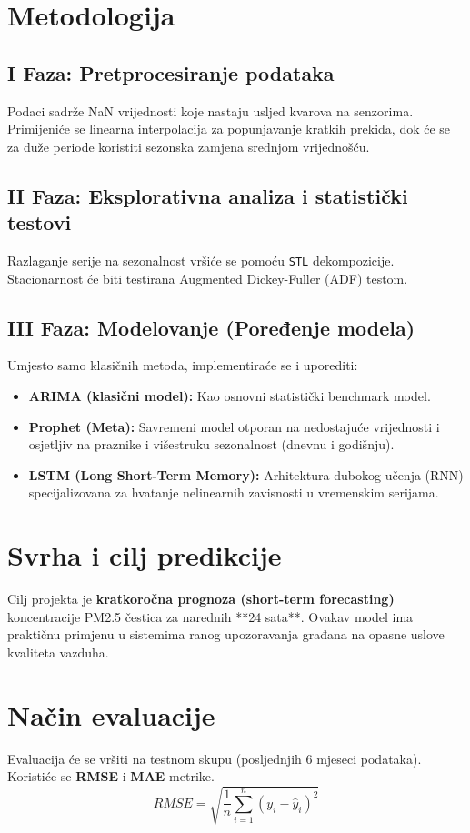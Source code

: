 \documentclass[12pt]{article}
\begin{document}
	\section{Metodologija}
	
	\subsection*{I Faza: Pretprocesiranje podataka}
	Podaci sadrže NaN vrijednosti koje nastaju usljed kvarova na senzorima. Primijeniće se linearna interpolacija za popunjavanje kratkih prekida, dok će se za duže periode koristiti sezonska zamjena srednjom vrijednošću.
	
	\subsection*{II Faza: Eksplorativna analiza i statistički testovi}
	Razlaganje serije na sezonalnost vršiće se pomoću \texttt{STL} dekompozicije. Stacionarnost će biti testirana Augmented Dickey-Fuller (ADF) testom.
	
	\subsection*{III Faza: Modelovanje (Poređenje modela)}
	Umjesto samo klasičnih metoda, implementiraće se i uporediti:
	\begin{itemize}
		\item \textbf{ARIMA (klasični model):} Kao osnovni statistički benchmark model.
		\item \textbf{Prophet (Meta):} Savremeni model otporan na nedostajuće vrijednosti i osjetljiv na praznike i višestruku sezonalnost (dnevnu i godišnju).
		\item \textbf{LSTM (Long Short-Term Memory):} Arhitektura dubokog učenja (RNN) specijalizovana za hvatanje nelinearnih zavisnosti u vremenskim serijama.
	\end{itemize}
	
	\section{Svrha i cilj predikcije}
	Cilj projekta je \textbf{kratkoročna prognoza (short-term forecasting)} koncentracije PM2.5 čestica za narednih **24 sata**. Ovakav model ima praktičnu primjenu u sistemima ranog upozoravanja građana na opasne uslove kvaliteta vazduha.
	
	\section{Način evaluacije}
	Evaluacija će se vršiti na testnom skupu (posljednjih 6 mjeseci podataka). Koristiće se \textbf{RMSE} i \textbf{MAE} metrike. 
	\[ RMSE = \sqrt{\frac{1}{n}\sum_{i=1}^{n}(y_i - \hat{y}_i)^2} \]
	
\end{document}
